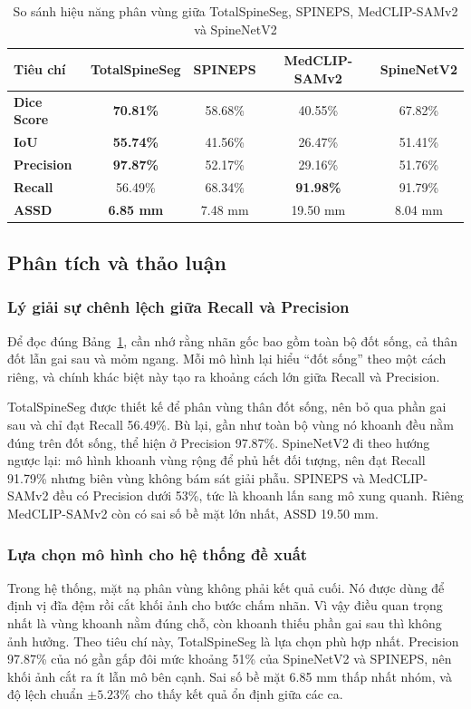 \begin{table}[h!]
    \centering
    \caption{So sánh hiệu năng phân vùng giữa TotalSpineSeg, SPINEPS, MedCLIP-SAMv2 và SpineNetV2}
    \label{tab:seg_results}
    \renewcommand{\arraystretch}{1.2}
    \setlength{\tabcolsep}{4pt}
    \begin{tabular}{lcccc}
        \toprule
        \textbf{Tiêu chí} & \textbf{TotalSpineSeg} & \textbf{SPINEPS} & \textbf{MedCLIP-SAMv2} & \textbf{SpineNetV2} \\
        \midrule
        \textbf{Dice Score} & \textbf{70.81\%} & 58.68\% & 40.55\% & 67.82\% \\
        \textbf{IoU} & \textbf{55.74\%} & 41.56\% & 26.47\% & 51.41\% \\
        \textbf{Precision}  & \textbf{97.87\%} & 52.17\% & 29.16\% & 51.76\% \\
        \textbf{Recall}  & 56.49\% & 68.34\% & \textbf{91.98\%} & 91.79\% \\
        \textbf{ASSD}  & \textbf{6.85 mm} & 7.48 mm & 19.50 mm & 8.04 mm \\
        \bottomrule
    \end{tabular}
\end{table}

\subsection{Phân tích và thảo luận}

\subsubsection{Lý giải sự chênh lệch giữa Recall và Precision}
Để đọc đúng Bảng~\ref{tab:seg_results}, cần nhớ rằng nhãn gốc bao gồm toàn bộ đốt sống, cả thân đốt lẫn gai sau và mỏm ngang. Mỗi mô hình lại hiểu ``đốt sống'' theo một cách riêng, và chính khác biệt này tạo ra khoảng cách lớn giữa Recall và Precision.

TotalSpineSeg được thiết kế để phân vùng thân đốt sống, nên bỏ qua phần gai sau và chỉ đạt Recall 56.49\%. Bù lại, gần như toàn bộ vùng nó khoanh đều nằm đúng trên đốt sống, thể hiện ở Precision 97.87\%. SpineNetV2 đi theo hướng ngược lại: mô hình khoanh vùng rộng để phủ hết đối tượng, nên đạt Recall 91.79\% nhưng biên vùng không bám sát giải phẫu. SPINEPS và MedCLIP-SAMv2 đều có Precision dưới 53\%, tức là khoanh lấn sang mô xung quanh. Riêng MedCLIP-SAMv2 còn có sai số bề mặt lớn nhất, ASSD 19.50 mm.

\subsubsection{Lựa chọn mô hình cho hệ thống đề xuất}
Trong hệ thống, mặt nạ phân vùng không phải kết quả cuối. Nó được dùng để định vị đĩa đệm rồi cắt khối ảnh cho bước chấm nhãn. Vì vậy điều quan trọng nhất là vùng khoanh nằm đúng chỗ, còn khoanh thiếu phần gai sau thì không ảnh hưởng. Theo tiêu chí này, TotalSpineSeg là lựa chọn phù hợp nhất. Precision 97.87\% của nó gần gấp đôi mức khoảng 51\% của SpineNetV2 và SPINEPS, nên khối ảnh cắt ra ít lẫn mô bên cạnh. Sai số bề mặt 6.85 mm thấp nhất nhóm, và độ lệch chuẩn $\pm 5.23\%$ cho thấy kết quả ổn định giữa các ca.


